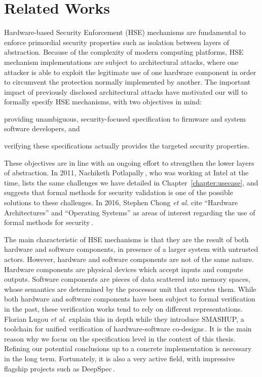 \chapter{Related Works}
\label{chapter:relatedwork}


\vspace{1cm}\noindent
%
Hardware-based Security Enforcement (HSE) mechanisms are fundamental to enforce
primordial security properties such as isolation between layers of abstraction.
%
Because of the complexity of modern computing platforms, HSE mechanism
implementations are subject to architectural attacks, where one attacker is able
to exploit the legitimate use of one hardware component in order to circumvent
the protection normally implemented by another.
%
The important impact of previously disclosed architectural attacks have
motivated our will to formally specify HSE mechanisms, with two objectives in
mind:
%
\begin{inparaenum}[(1)]
\item providing unambiguous, security-focused specification to firmware and
  system software developers, and
%
\item verifying these specifications actually provides the targeted security
  properties.
\end{inparaenum}
%
These objectives are in line with an ongoing effort to strengthen the lower
layers of abstraction.
%
In 2011, Nachiketh Potlapally\,\cite{potlapally2011hardwaresecurity}, who was
working at Intel at the time, lists the same challenges we have detailed in
Chapter~\ref{chapter:usecase}, and suggests that formal methods for security
validation is one of the possible solutions to these challenges.
%
In 2016, Stephen Chong \emph{et al.} cite ``Hardware Architectures'' and
``Operating Systems'' as areas of interest regarding the use of formal methods
for security\,\cite{chong2016report}.

The main characteristic of HSE mechanisms is that they are the result of both
hardware and software components, in presence of a larger system with untrusted
actors.
%
However, hardware and software components are not of the same nature.
%
Hardware components are physical devices which accept inputs and compute
outputs.
%
Software components are pieces of data scattered into memory spaces, whose
semantics are determined by the processor unit that executes them.
%
While both hardware and software components have been subject to formal
verification in the past, these verification works tend to rely on different
representations.
%
Florian Lugou \emph{et al.} explain this in depth while they introduce SMASHUP,
a toolchain for unified verification of hardware-software
co-designs\,\cite{lugou2017smashup}.
%
It is the main reason why we focus on the specification level in the context of
this thesis.
%
Refining our potential conclusions up to a concrete implementation is necessary
in the long term.
%
Fortunately, it is also a very active field, with impressive flagship projects
such as DeepSpec\,\cite{appel2017deepspec}.

